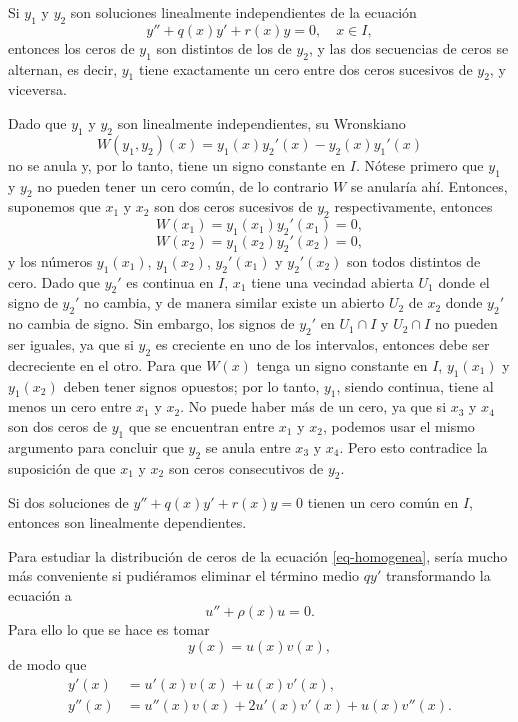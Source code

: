 \documentclass[main.tex]{subfiles}
\begin{document}
\begin{teorema}
Si \(y_1\) y \(y_2\) son soluciones linealmente independientes de la ecuación
\[
y'' + q(x) y' + r(x) y = 0, \quad x\in I,
\]
entonces los ceros de \(y_1\) son distintos de los de \(y_2 \), y las dos secuencias de ceros se alternan, es decir, \(y_1\) tiene exactamente un cero entre dos ceros sucesivos de \(y_2\), y viceversa.
\end{teorema}
\dem Dado que \( y_1 \) y \( y_2 \) son linealmente independientes, su Wronskiano
\[
W(y_1, y_2)(x) = y_1(x) y_2'(x) - y_2(x) y_1'(x)
\]
no se anula y, por lo tanto, tiene un signo constante en \(I\). Nótese primero que \(y_1\) y \( y_2 \) no pueden tener un cero común, de lo contrario \(W\) se anularía ahí. Entonces, suponemos que \(x_1\) y \(x_2\) son dos ceros sucesivos de \(y_2\) respectivamente, entonces
\[
W(x_1) = y_1(x_1) y_2'(x_1) = 0,
\]
\[
W(x_2) = y_1(x_2) y_2'(x_2) = 0,
\]
y los números \( y_1(x_1) \), \( y_1(x_2) \), \( y_2'(x_1) \) y \( y_2'(x_2) \) son todos distintos de cero. Dado que \( y_2' \) es continua en \(I\), \(x_1\) tiene una vecindad abierta \(U_1\) donde el signo de \(y_2'\) no cambia, y de manera similar existe un abierto \(U_2\) de \(x_2\) donde \(y_2'\) no cambia de signo. Sin embargo, los signos de \(y_2'\) en \(U_1\cap  I\) y \(U_2\cap I\) no pueden ser iguales, ya que si \(y_2\) es creciente en uno de los intervalos, entonces debe ser decreciente en el otro. Para que \(W(x)\) tenga un signo constante en \(I\), \( y_1(x_1) \) y \( y_1(x_2) \) deben tener signos opuestos; por lo tanto, \(y_1\), siendo continua, tiene al menos un cero entre \(x_1\) y \(x_2\). No puede haber más de un cero, ya que si \(x_3\) y \(x_4\) son dos ceros de \( y_1 \) que se encuentran entre \(x_1\) y \(x_2\), podemos usar el mismo argumento para concluir que \(y_2\) se anula entre \(x_3\) y \(x_4\). Pero esto contradice la suposición de que \(x_1\) y \(x_2\) son ceros consecutivos de \( y_2 \).\QED\\
\begin{cor}
Si dos soluciones de \(y'' + q(x) y' + r(x)y=0\) tienen un cero común en \(I\), entonces son linealmente dependientes.
\end{cor}
Para estudiar la distribución de ceros de la ecuación \ref{eq-homogenea}, sería mucho más conveniente si pudiéramos eliminar el término medio \(q y'\) transformando la ecuación a
\[
u'' + \rho(x) u = 0.
\]
Para ello lo que se hace es tomar
\[
y(x) = u(x) v(x),
\]
de modo que
\begin{align*}
y'(x) &= u'(x) v(x) + u(x) v'(x),\\
y''(x) &= u''(x) v(x) + 2 u'(x) v'(x) + u(x) v''(x).
\end{align*}
\end{document}
